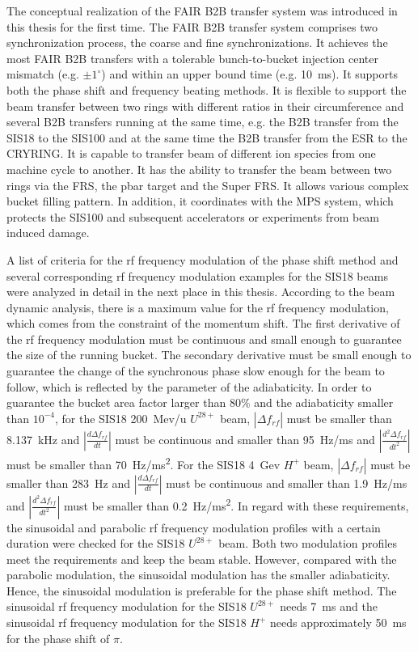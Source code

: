 
The conceptual realization of the FAIR B2B transfer system was introduced in this thesis for the first time. The FAIR B2B transfer system comprises two synchronization process, the coarse and fine synchronizations. It achieves the most FAIR B2B transfers with a tolerable bunch-to-bucket injection center mismatch (e.g. $\pm 1^\circ$) and within an upper bound time (e.g. \SI{10}{\ms}). It supports both the phase shift and frequency beating methods. It is flexible to support the beam transfer between two rings with different ratios in their circumference and several B2B transfers running at the same time, e.g. the B2B transfer from the SIS18 to the SIS100 and at the same time the B2B transfer from the ESR to the CRYRING. It is capable to transfer beam of different ion species from one machine cycle to another. It has the ability to transfer the beam between two rings via the FRS, the pbar target and the Super FRS. It allows various complex bucket filling pattern. In addition, it coordinates with the MPS system, which protects the SIS100 and subsequent accelerators or experiments from beam induced damage. 


A list of criteria for the rf frequency modulation of the phase shift method and several corresponding rf frequency modulation examples for the SIS18 beams were analyzed in detail in the next place in this thesis.  According to the beam dynamic analysis, there is a maximum value for the rf frequency modulation, which comes from the constraint of the momentum shift. The first derivative of the rf frequency modulation must be continuous and small enough to guarantee the size of the running bucket. The secondary derivative must be small enough to guarantee the change of the synchronous phase slow enough for the beam to follow, which is reflected by the parameter of the adiabaticity. In order to guarantee the bucket area factor larger than $80\%$ and the adiabaticity smaller than $10^{-4}$, for the SIS18 \SI{200}{Mev/u} $U^{28+}$ beam, $|\Delta f_{\mathit{rf}}|$ must be smaller than \SI{8.137}{kHz} and $|\frac{d\Delta f_{\mathit{rf}}}{dt}|$ must be continuous and smaller than \SI{95}{Hz/ms} and $|\frac{d^2\Delta f_{\mathit{rf}}}{dt^2}|$ must be smaller than \SI{70}{Hz/ms^2}. For the SIS18 \SI{4}{Gev} $H^{+}$ beam, $|\Delta f_{\mathit{rf}}|$ must be smaller than \SI{283}{Hz} and $|\frac{d\Delta f_{\mathit{rf}}}{dt}|$ must be continuous and smaller than \SI{1.9}{Hz/ms} and $|\frac{d^2\Delta f_{\mathit{rf}}}{dt^2}|$ must be smaller than \SI{0.2}{Hz/ms^2}.  In regard with these requirements, the sinusoidal and parabolic rf frequency modulation profiles with a certain duration were checked for the SIS18 $U^{28+}$ beam. Both two modulation profiles meet the requirements and keep the beam stable. However, compared with the parabolic modulation, the sinusoidal modulation has the smaller adiabaticity. Hence, the sinusoidal modulation is preferable for the phase shift method. The sinusoidal rf frequency modulation for the SIS18 $U^{28+}$ needs \SI{7}{\ms} and the sinusoidal rf frequency modulation for the SIS18 $H^{+}$ needs approximately \SI{50}{\ms} for the phase shift of $\pi$. 


